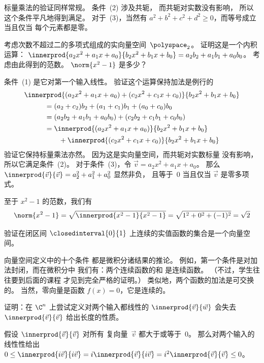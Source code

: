 \begin{exercises}
\begin{answer}
标量乘法的验证同样常规。
条件~(2) 涉及共轭，
而共轭对实数没有影响，
所以这个条件平凡地得到满足。
对于~(3)，当然有 $a^2+b^2+c^2+d^2\geq 0$，而等号成立当且仅当
每个元素都是零。
\end{answer}
%
\item 考虑次数不超过二的多项式组成的实向量空间~$\polyspace_2$。
证明这是一个内积运算：
$\innerprod{a_2x^2+a_1x+a_0}{b_2x^2+b_1x+b_0}=a_2b_2+a_1b_1+a_0b_0$。
考虑由此得到的范数。
$\norm{x^2-1}$ 是多少？
\begin{answer}
条件~(1) 是它对第一个输入线性。
验证这个运算保持加法是例行的
\begin{multline*}
  \innerprod{(a_2x^2+a_1x+a_0)+(c_2x^2+c_1x+c_0)}{b_2x^2+b_1x+b_0}  \\
  \begin{split}
    &=(a_2+c_2)b_2+(a_1+c_1)b_1+(a_0+c_0)b_0             \\
    &=(a_2b_2+a_1b_1+a_0b_0)+(c_2b_2+c_1b_1+c_0b_0)             \\
    &=\innerprod{(a_2x^2+a_1x+a_0)}{b_2x^2+b_1x+b_0}      \\
      &\qquad+\innerprod{(c_2x^2+c_1x+c_0)}{b_2x^2+b_1x+b_0}
  \end{split}
\end{multline*}
验证它保持标量乘法亦然。
因为这是实向量空间，而共轭对实数标量
没有影响，所以它满足条件~(2)。
对于条件~(3)，令 $\vec{v}=a_2x^2+a_1x+a_0$。
那么 $\innerprod{\vec{v}}{\vec{v}}=a_2^2+a_1^2+a_0^2$ 显然非负，
且等于~$0$ 当且仅当 $\vec{v}$ 是零多项式。

至于 $x^2-1$ 的范数，我们有
\begin{equation*} 
 \norm{x^2-1}=\sqrt{\innerprod{x^2-1}{x^2-1}}=\sqrt{1^2+0^2+(-1)^2}=\sqrt{2}
\end{equation*}
\end{answer}

\item 验证在闭区间
$\closedinterval{0}{1}$ 上连续的实值函数的集合是一个向量空间。
\begin{answer}
向量空间定义中的十个条件
都是微积分诸结果的推论。
例如，第一个条件是对加法封闭，而在微积分中
我们有：两个连续函数的和
是连续函数。
（不过，学生往往要到后面的课程
才见到完全严格的证明。）
类似地，两个函数的加法是可交换的。
当然，零向量是函数 $f(x)=0$，它是连续的。
\end{answer}

%
\item
证明：在 $\C^n$ 上尝试定义对两个输入都线性的 $\innerprod{\vec{v}}{\vec{w}}$
会失去
$\innerprod{\vec{v}}{\vec{v}}$ 给出长度的性质。
\begin{answer}
假设
$\innerprod{\vec{v}}{\vec{v}}$ 对所有
复向量~$\vec{v}$ 都大于或等于~$0$。
那么对两个输入的线性性给出
$0\leq \innerprod{i\vec{v}}{i\vec{v}}
  =i\innerprod{\vec{v}}{i\vec{v}}
  =i^2\innerprod{\vec{v}}{\vec{v}}\leq 0$。
\end{answer}



\end{exercises}
